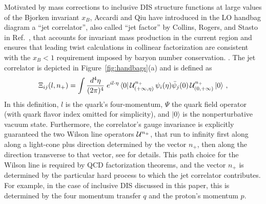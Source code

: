 \documentclass[preprintnumbers,floatfix,nofootinbib]{revtex4}
\newcommand{\de}{d}                    %
\begin{document}
Motivated by mass corrections to inclusive DIS structure functions at large values of the Bjorken invariant $x_B$,
Accardi and Qiu \cite{Accardi:2008ne} have introduced in the LO handbag diagram 
a ``jet correlator'', also called ``jet factor'' by Collins, Rogers, and Stasto in Ref.~\cite{Collins:2007ph}, that accounts for invariant mass production in the current region and ensures that leading twist calculations in collinear factorization are consistent with the $x_B<1$ requirement imposed by baryon number conservation. \cite{Accardi:2008ne}. The jet correlator is depicted in
Figure~\ref{fig:handbags}(a) and is defined as 
\begin{align}
\Xi_{ij}(l,n_+) =\int
  \frac{\de^4\eta}{(2\pi)^4}\; e^{i l \cdot \eta}\,
    \langle 0|\, {\cal U}^{n_+}_{(+\infty,\eta)}
\,\psi_i(\eta)
             \bar{\psi}_j(0)\,
{\cal U}^{n_+}_{(0,+\infty)}\,   |0 \rangle \ ,
\label{e:xifull}
\end{align} 
In this definition, $l$ is the quark's four-momentum, $\Psi$ the quark field
operator (with quark flavor index omitted for simplicity), and $|0\rangle$ is
the nonperturbative vacuum state. Furthermore, the correlator's gauge invariance is explicitly guaranteed the two Wilson line operators ${\cal
  U}^{n_+}$, that run to infinity first along along a light-cone plus direction determined by the vector $n_+$, then along the direction transverse to that vector, see \cite{Bacchetta:2006tn} for details. This path choice for the Wilson line is required by QCD factorization theorems, and the vector $n_+$ is determined by the particular hard process to which the jet correlator contributes. For example, in the case of inclusive DIS
discussed in this paper, this is determined by the four momentum transfer $q$
and the proton's momentum $p$. 
\end{document}
